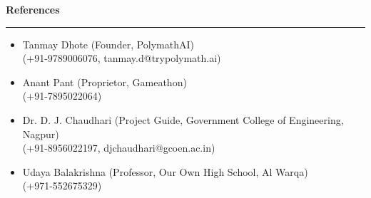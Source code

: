 \documentclass[a4paper,11pt]{article}
\renewcommand{\section}[1]{\vspace{0.5em}\textbf{\Large #1}\vspace{0.2em}\hrule\vspace{0.5em}}
\begin{document}
\section{References}
\begin{itemize}
    \item Tanmay Dhote (Founder, PolymathAI)\\
          (+91-9789006076, tanmay.d@trypolymath.ai)
    \item Anant Pant (Proprietor, Gameathon)\\
          (+91-7895022064)
    \item Dr. D. J. Chaudhari (Project Guide, Government College of Engineering, Nagpur)\\
          (+91-8956022197, djchaudhari@gcoen.ac.in)
    \item Udaya Balakrishna (Professor, Our Own High School, Al Warqa)\\
          (+971-552675329)
\end{itemize}
\end{document}
